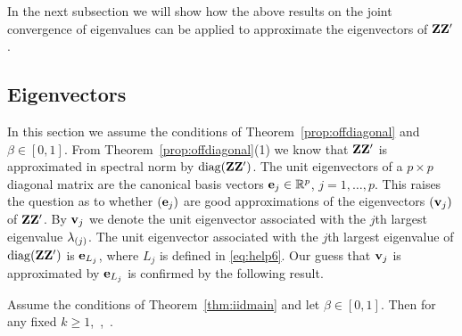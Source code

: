 In the next subsection we will show how the above results on the joint convergence of eigenvalues can be applied to approximate the eigenvectors of ${\mathbf Z}{\mathbf Z}'$.

\subsection{Eigenvectors}\label{sec:eigenvectors}
In this section we assume the conditions of Theorem~\ref{prop:offdiagonal} and $\beta \in [0,1]$.
From Theorem~\ref{prop:offdiagonal}(1) %
we know that ${\mathbf Z}{\mathbf Z}'$ is approximated in spectral norm by $\operatorname{diag}({\mathbf Z}{\mathbf Z}')$.
The unit eigenvectors %
of a $p\times p$ diagonal matrix are the canonical basis vectors ${\mathbf e}_j\in\mathbb{R}^p$, $j=1,\dots,p$. 
This raises the question as to whether $({\mathbf e}_j)$ are good approximations of the eigenvectors $({\mathbf v}_j)$ of ${\mathbf Z}{\mathbf Z}'$.
By ${\mathbf v}_{{j}}$ we denote the unit eigenvector associated with the $j$th largest eigenvalue $\lambda_{(j)}$. The unit eigenvector associated with the $j$th largest eigenvalue of $\operatorname{diag}({\mathbf Z}{\mathbf Z}')$ is ${\mathbf e}_{L_j}$, where $L_j$ is defined in \eqref{eq:help6}. Our guess that ${\mathbf v}_j$ is approximated by ${\mathbf e}_{L_j}$ is confirmed by the following result.

\begin{theorem}\label{thm:eigenvec} Assume the conditions of Theorem~\ref{thm:iidmain} and let
$\beta\in [0,1]$. Then for any fixed $k\ge 1$,
\beao
{} \,, \quad \nto \,.
\eeao
\end{theorem}

